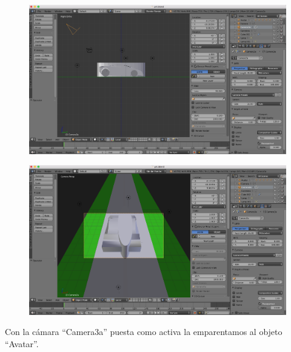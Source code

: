 \documentclass[10pt]{article}
\begin{document}
\begin{figure}[H]
	\begin{center}
	 		\includegraphics[width = 1.00\textwidth]{Imagenes/p4-img19}
	\end{center} 
\end{figure}

\begin{figure}[H]
	\begin{center}
	 		\includegraphics[width = 1.00\textwidth]{Imagenes/p4-img20}
	\end{center} 
\end{figure}

Con la cámara ``Camera3a'' puesta como activa la emparentamos al objeto ``Avatar''. \\
\end{document}
